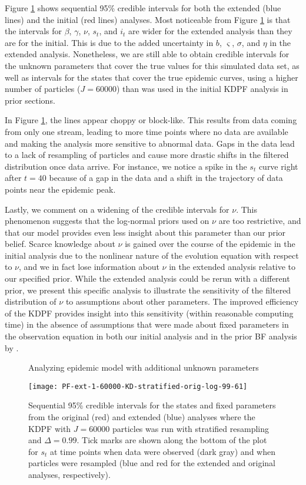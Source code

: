 Figure \ref{fig:epid:ext} shows sequential 95\% credible intervals for both the extended (blue lines) and the initial (red lines) analyses. Most noticeable from Figure \ref{fig:epid:ext} is that the intervals for $\beta$, $\gamma$, $\nu$, $s_t$, and $i_t$ are wider for the extended analysis than they are for the initial. This is due to the added uncertainty in $b$, $\varsigma$, $\sigma$, and $\eta$ in the extended analysis. Nonetheless, we are still able to obtain credible intervals for the unknown parameters that cover the true values for this simulated data set, as well as intervals for the states that cover the true epidemic curves, using a higher number of particles ($J = 60000$) than was used in the initial KDPF analysis in prior sections.

In Figure \ref{fig:epid:ext}, the lines appear choppy or block-like. This results from data coming from only one stream, leading to more time points where no data are available and making the analysis more sensitive to abnormal data. Gaps in the data lead to a lack of resampling of particles and cause more drastic shifts in the filtered distribution once data arrive. For instance, we notice a spike in the $s_t$ curve right after $t = 40$ because of a gap in the data and a shift in the trajectory of data points near the epidemic peak.

Lastly, we comment on a widening of the credible intervals for $\nu$. This phenomenon suggests that the log-normal priors used on $\nu$ are too restrictive, and that our model provides even less insight about this parameter than our prior belief. Scarce knowledge about $\nu$ is gained over the course of the epidemic in the initial analysis due to the nonlinear nature of the evolution equation with respect to $\nu$, and we in fact lose information about $\nu$ in the extended analysis relative to our specified prior. While the extended analysis could be rerun with a different prior, we present this specific analysis to illustrate the sensitivity of the filtered distribution of $\nu$ to assumptions about other parameters. The improved efficiency of the KDPF provides insight into this sensitivity (within reasonable computing time) in the absence of assumptions that were made about fixed parameters in the observation equation in both our initial analysis and in the prior BF analysis by \citet{skvortsov2012monitoring}.

\begin{figure}
\ssp
\centering
\caption{Analyzing epidemic model with additional unknown parameters} \label{fig:epid:ext}
\texttt{[image: PF-ext-1-60000-KD-stratified-orig-log-99-61]}
\caption*{Sequential 95\% credible intervals for the states and fixed parameters from the original (red) and extended (blue) analyses where the KDPF with $J = 60000$ particles was run with stratified resampling and $\Delta = 0.99$. Tick marks are shown along the bottom of the plot for $s_t$ at time points when data were observed (dark gray) and when particles were resampled (blue and red for the extended and original analyses, respectively).}
\end{figure}


